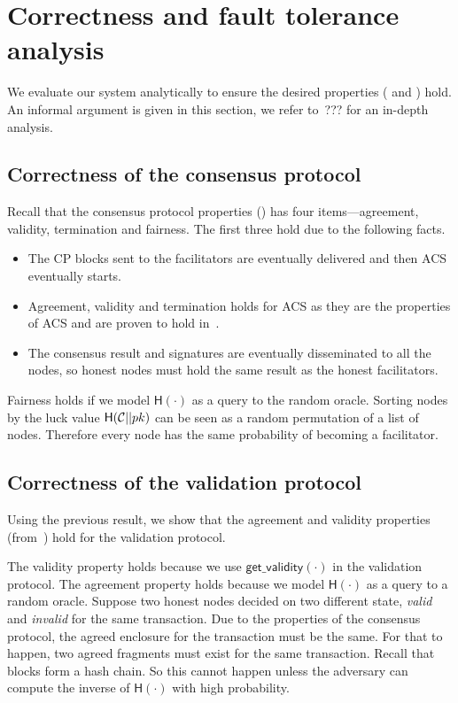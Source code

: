 \section{Correctness and fault tolerance analysis}
\label{sec:analysis}
We evaluate our system analytically to ensure the desired properties ( and ) hold.
An informal argument is given in this section, we refer to~\cite[Chapter 4]{checo}??? for an in-depth analysis.

\subsection{Correctness of the consensus protocol}
Recall that the consensus protocol properties () has
four items---agreement, validity, termination and fairness.
The first three hold due to the following facts.
\begin{itemize}
    \item The CP blocks sent to the facilitators are eventually delivered and then ACS eventually starts.
    \item Agreement, validity and termination holds for ACS as they are the properties of ACS and are proven to hold in~\cite{miller2016honey}.
    \item The consensus result and signatures are eventually disseminated to all the nodes,
        so honest nodes must hold the same result as the honest facilitators.
\end{itemize}

Fairness holds if we model $\textsf{H}(\cdot)$ as a query to the random oracle.
Sorting nodes by the luck value $\textsf{H}(\mathcal{C} || pk)$ can be seen as a random permutation of a list of nodes.
Therefore every node has the same probability of becoming a facilitator.

\subsection{Correctness of the validation protocol}
\label{sec:correctness-of-validity}
Using the previous result,
we show that the agreement and validity properties (from~) hold for the validation protocol.

The validity property holds because we use $\textsf{get\_validity}(\cdot)$ in the validation protocol.
The agreement property holds because we model $\textsf{H}(\cdot)$ as a query to a random oracle.
Suppose two honest nodes decided on two different state, \emph{valid} and \emph{invalid} for the same transaction.
Due to the properties of the consensus protocol, the agreed enclosure for the transaction must be the same.
For that to happen, two agreed fragments must exist for the same transaction.
Recall that blocks form a hash chain.
So this cannot happen unless the adversary can compute the inverse of $\textsf{H}(\cdot)$ with high probability.

